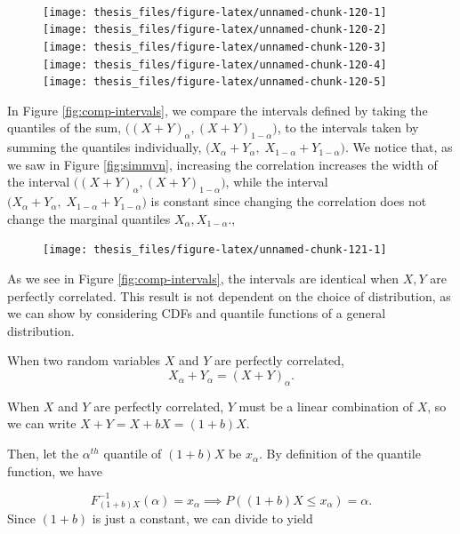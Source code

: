 \documentclass[12pt,twoside]{smiththesis}
\begin{document}
~
\begin{figure}

{\centering \texttt{[image: thesis\_files/figure-latex/unnamed-chunk-120-1]} \texttt{[image: thesis\_files/figure-latex/unnamed-chunk-120-2]} \texttt{[image: thesis\_files/figure-latex/unnamed-chunk-120-3]} \texttt{[image: thesis\_files/figure-latex/unnamed-chunk-120-4]} \texttt{[image: thesis\_files/figure-latex/unnamed-chunk-120-5]} 

}

\caption{\label{fig:simmvn}}\label{fig:unnamed-chunk-120}
\end{figure}
In Figure \ref{fig:comp-intervals}, we compare the intervals defined by taking the quantiles of the sum, \(\Big((X+Y)_\alpha, (X+Y)_{1-\alpha}\Big)\), to the intervals taken by summing the quantiles individually, \(\Big(X_\alpha +Y_\alpha, \; X_{1-\alpha} +Y_{1-\alpha}\Big)\). We notice that, as we saw in Figure \ref{fig:simmvn}, increasing the correlation increases the width of the interval \(\Big((X+Y)_\alpha, (X+Y)_{1-\alpha}\Big)\), while the interval \(\Big(X_\alpha +Y_\alpha, \; X_{1-\alpha} +Y_{1-\alpha}\Big)\) is constant since changing the correlation does not change the marginal quantiles \(X_\alpha, X_{1-\alpha}\).,
\begin{figure}

{\centering \texttt{[image: thesis\_files/figure-latex/unnamed-chunk-121-1]} 

}

\caption{\label{fig:comp-intervals}}\label{fig:unnamed-chunk-121}
\end{figure}
As we see in Figure \ref{fig:comp-intervals}, the intervals are identical when \(X,Y\) are perfectly correlated. This result is not dependent on the choice of distribution, as we can show by considering CDFs and quantile functions of a general distribution.
\begin{tcolorbox}[title = Quantiles of the Sum of Perfectly Correlated Random Variables]
When two random variables $X$ and $Y$ are perfectly correlated,
$$X_\alpha + Y_\alpha = (X+Y)_\alpha.$$
\end{tcolorbox}
When \(X\) and \(Y\) are perfectly correlated, \(Y\) must be a linear combination of \(X\), so we can write \(X+Y= X+bX=(1+b)X\).

Then, let the \(\alpha^{th}\) quantile of \((1+b)X\) be \(x_\alpha\). By definition of the quantile function, we have

\[F^{-1}_{(1+b) X } (\alpha) = x_\alpha \implies P((1+b) X \leq x_\alpha) = \alpha.\]
Since \((1+b)\) is just a constant, we can divide to yield
\end{document}
